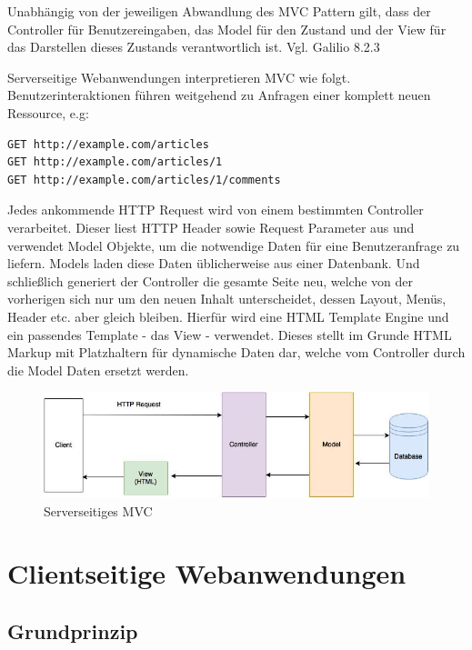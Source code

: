 Unabhängig von der jeweiligen Abwandlung des MVC Pattern gilt, dass der Controller für Benutzereingaben, das Model für den Zustand und der View für das Darstellen dieses Zustands verantwortlich ist. Vgl. Galilio  8.2.3

Serverseitige Webanwendungen interpretieren MVC wie folgt. Benutzerinteraktionen führen weitgehend zu Anfragen einer komplett neuen Ressource, e.g:

\begin{verbatim}
GET http://example.com/articles
GET http://example.com/articles/1
GET http://example.com/articles/1/comments
\end{verbatim}

Jedes ankommende HTTP Request wird von einem bestimmten Controller verarbeitet. Dieser liest HTTP Header sowie Request Parameter aus und verwendet Model Objekte, um die notwendige Daten für eine Benutzeranfrage zu liefern. Models laden diese Daten üblicherweise aus einer Datenbank. Und schließlich generiert der Controller die gesamte Seite neu, welche von der vorherigen sich nur um den neuen Inhalt unterscheidet, dessen Layout, Menüs, Header etc. aber gleich bleiben. Hierfür wird eine HTML Template Engine und ein passendes Template - das View - verwendet. Dieses stellt im Grunde HTML Markup mit Platzhaltern für dynamische Daten dar, welche vom Controller durch die Model Daten ersetzt werden.


\begin{figure}[htp]     %
\centering
\includegraphics[width=1.0\textwidth]{images/server_side_mvc} 
\caption{Serverseitiges MVC}\label{server_side_mvc}
\end{figure}

\section{Clientseitige Webanwendungen}

\subsection{Grundprinzip}

